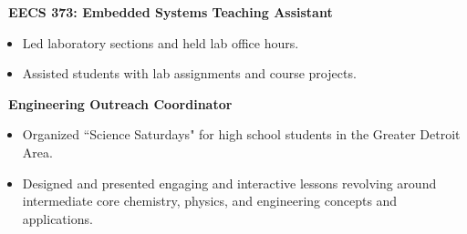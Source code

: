 \documentclass[]{article}
\begin{document}
 \newline
	{\bf \ EECS 373: Embedded Systems Teaching Assistant}
	\begin{itemize}[label={$\bullet$}]
		\item Led laboratory sections and held lab office hours.
		\item Assisted students with lab assignments and course projects.
	\end{itemize}

 \newline
	{\bf \ Engineering Outreach Coordinator}
	\begin{itemize}[label={$\bullet$}]
		\item Organized ``Science Saturdays" for high school students in the Greater Detroit Area.
		\item Designed and presented engaging and interactive lessons revolving around intermediate core chemistry, physics, and engineering concepts and applications.
	\end{itemize}
\fi








\end{document}
